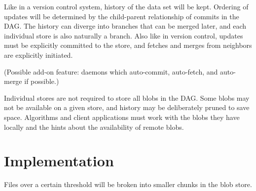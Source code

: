 \documentclass[a4paper]{article}
\begin{document}
Like in a version control system, history of the data set will be kept. Ordering
of updates will be determined by the child-parent relationship of commits in the
DAG. The history can diverge into branches that can be merged later, and each
individual store is also naturally a branch. Also like in version control,
updates must be explicitly committed to the store, and fetches and merges from
neighbors are explicitly initiated.

(Possible add-on feature: daemons which auto-commit, auto-fetch, and auto-merge
if possible.)

Individual stores are not required to store all blobs in the DAG. Some blobs may
not be available on a given store, and history may be deliberately pruned to
save space. Algorithms and client applications must work with the blobs they
have locally and the hints about the availability of remote blobs.


\section{Implementation}\label{implementation}


Files over a certain threshold will be broken into smaller chunks in the blob
store.


% 
% 
\end{document}
